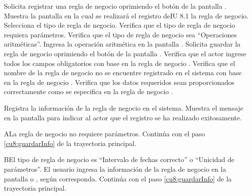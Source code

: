  \begin{UCtrayectoria}
    \UCpaso[\UCactor] Solicita registrar una regla de negocio oprimiendo el botón  de la pantalla .
    \UCpaso[\UCsist] Muestra la pantalla  en la cual se realizará el registro deIU 8.1 la regla de negocio. 
    \UCpaso[\UCactor] Selecciona el tipo de regla de negocio. \label{cu8:ingresaDatos}
    \UCpaso[\UCsist] Verifica que el tipo de regla de negocio requiera parámetros. 
    \UCpaso[\UCsist] Verifica que el tipo de regla de negocio sea ``Operaciones aritméticas''. 
    \UCpaso[\UCactor] Ingresa la operación aritmética en la pantalla .        \label{cu8:ingresaPaso}
    \UCpaso[\UCactor] Solicita guardar la regla de negocio oprimiendo el botón  de la pantalla .  \label{cu8:guardarInfo}
    \UCpaso[\UCsist] Verifica que el actor ingrese todos los campos obligatorios con base en la regla de negocio  . 
    \UCpaso[\UCsist] Verifica que el nombre de la regla de negocio no se encuentre registrado en el sistema con base en la regla de negocio  . 
    \UCpaso[\UCsist] Verifica que los datos requeridos sean proporcionados correctamente como se especifica en la regla de negocio . 
    
    \UCpaso[\UCsist] Registra la información de la regla de negocio en el sistema.
    \UCpaso[\UCsist] Muestra el mensaje  en la pantalla 
    para indicar al actor que el registro se ha realizado exitosamente.
 \end{UCtrayectoria}
 
 
 \begin{UCtrayectoriaA}{A}{La regla de negocio no requiere parámetros.}
	\UCpaso[] Continúa con el paso \ref{cu8:guardarInfo} de la trayectoria principal.
 \end{UCtrayectoriaA}
 
 \begin{UCtrayectoriaA}{B}{El tipo de regla de negocio es ``Intervalo de fechas correcto'' o ``Unicidad de parámetros''.}
	\UCpaso[\UCactor] El usuario ingresa la información de la regla de negocio en la pantalla 
	o , según corresponda.
	\UCpaso[] Continúa con el paso \ref{cu8:guardarInfo} de la trayectoria principal.
 \end{UCtrayectoriaA}

